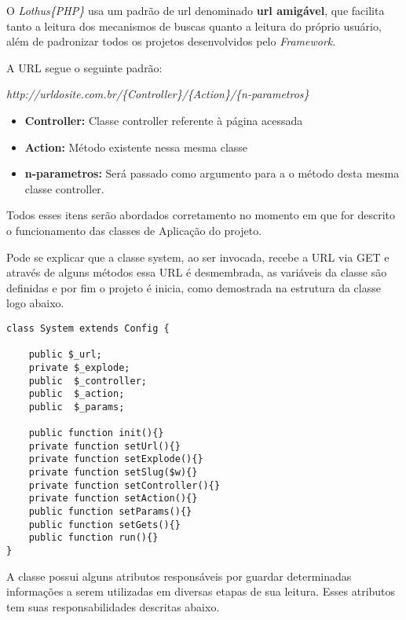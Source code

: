             O \emph{Lothus\{PHP\}} usa um padrão de url denominado \textbf{url amigável}, que facilita tanto a leitura dos mecanismos de buscas quanto a leitura do próprio usuário, além de padronizar todos os projetos desenvolvidos pelo \emph{Framework}.

            A URL segue o seguinte padrão:

            \emph{http://urldosite.com.br/\{Controller\}/\{Action\}/\{n-parametros\}}

            \begin{itemize}
                \item\textbf{Controller:} Classe controller referente à página acessada
                \item\textbf{Action:} Método existente nessa mesma classe
                \item\textbf{n-parametros:} Será passado como argumento para a o método desta mesma classe controller.
            \end{itemize}

            Todos esses itens serão abordados corretamento no momento em que for descrito o funcionamento das classes de Aplicação do projeto.

            Pode se explicar que a classe system, ao ser invocada, recebe a URL via GET e através de alguns métodos essa URL é desmembrada, as variáveis da classe são definidas e por fim o projeto é inicia, como demostrada na estrutura da classe logo abaixo.

\begin{lstlisting}
class System extends Config {

    public $_url;
    private $_explode;
    public  $_controller;
    public  $_action;
    public  $_params;

    public function init(){}
    private function setUrl(){}
    private function setExplode(){}
    private function setSlug($w){}
    private function setController(){}
    private function setAction(){}
    public function setParams(){}
    public function setGets(){}
    public function run(){}
}
\end{lstlisting}

            A classe possui alguns atributos responsáveis por guardar determinadas informações a serem utilizadas em diversas etapas de sua leitura. Esses atributos tem suas responsabilidades descritas abaixo.

